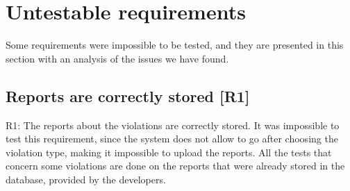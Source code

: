 \documentclass[../ATD.tex]{subfiles}
\begin{document}
    \section{Untestable requirements}\label{sec:untestable-requirements}
    Some requirements were impossible to be tested, and they are presented in this section with an analysis of the issues we have found.

    \subsection{Reports are correctly stored [R1]}\label{subsec:report-are-correctly-stored}
    R1: The reports about the violations are correctly stored.
    \newline
    It was impossible to test this requirement, since the system does not allow to go after choosing the violation type, making it impossible to upload the reports.
    All the tests that concern some violations are done on the reports that were already stored in the database, provided by the developers.
\end{document}
